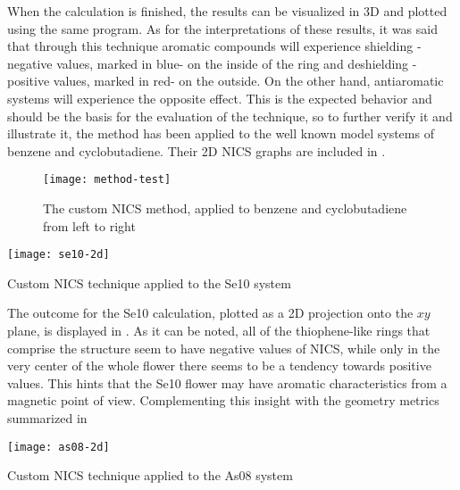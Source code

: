When the calculation is finished, the results can be visualized in 3D and plotted using the same program.
As for the interpretations of these results, it was said that through this technique aromatic compounds will experience shielding -negative values, marked in blue- on the inside of the ring and deshielding -positive values, marked in red- on the outside.
On the other hand, antiaromatic systems will experience the opposite effect.
This is the expected behavior and should be the basis for the evaluation of the technique, so to further verify it and illustrate it, the method has been applied to the well known model systems of benzene and cyclobutadiene.
Their 2D NICS graphs are included in .

\begin{figure}[h]
    \texttt{[image: method-test]}
    \caption[NICS applied to test systems]{The custom NICS method, applied to benzene and cyclobutadiene from left to right}
\end{figure}

\begin{marginfigure}
    \texttt{[image: se10-2d]}
    \caption[NICS applied to Se10]{Custom NICS technique applied to the Se10 system}
\end{marginfigure}

The outcome for the Se10 calculation, plotted as a 2D projection onto the $xy$ plane, is displayed in .
As it can be noted, all of the thiophene-like rings that comprise the structure seem to have negative values of NICS, while only in the very center of the whole flower there seems to be a tendency towards positive values.
This hints that the Se10 flower may have aromatic characteristics from a magnetic point of view.
Complementing this insight with the geometry metrics summarized in 


\begin{marginfigure}
    \texttt{[image: as08-2d]}
    \caption[NICS applied to As08]{Custom NICS technique applied to the As08 system}
\end{marginfigure}



